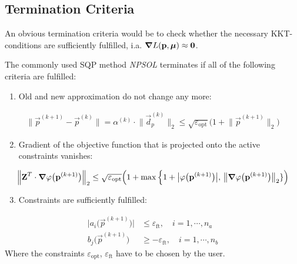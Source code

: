 		\subsection{Termination Criteria}
			An obvious termination criteria would be to check whether the necessary KKT-conditions are sufficiently fulfilled, i.a. \( \grad{L}(\boldsymbol{\mathrm{p}}, \boldsymbol{\mathrm{\mu}}) \approx \boldsymbol{\mathrm{0}} \).
			
			The commonly used SQP method \emph{NPSOL} terminates if all of the following criteria are fulfilled:
			\begin{enumerate}
				\item Old and new approximation do not change any more:
			\end{enumerate}
			\begin{align*}
				\big\lVert \vec{p}^{(k + 1)} - \vec{p}^{(k)} \big\rVert = \alpha^{(k)} \cdot \big\lVert \vec{d}_p^{(k)} \big\rVert_2 \leq \sqrt{\varepsilon_\mathrm{opt}} \Big( 1 + \big\lVert \vec{p}^{(k + 1)} \big\rVert_2 \Big)
			\end{align*}
			\begin{enumerate}
				\setcounter{enumi}{1}
				\item Gradient of the objective function that is projected onto the active constraints vanishes:
			\end{enumerate}
			\begin{align*}
				\Big\lVert \boldsymbol{\mathrm{Z}}^T \cdot \grad{\varphi}\big(\boldsymbol{\mathrm{p}}^{(k + 1)}\big) \Big\rVert_2 \leq \sqrt{\varepsilon_\mathrm{opt}} \Big( 1 + \max\Big\{ 1 + \big\lvert \varphi\big(\boldsymbol{\mathrm{p}}^{(k + 1)}\big) \big\rvert,\, \big\lVert \grad{\varphi}\big(\boldsymbol{\mathrm{p}}^{(k + 1)}\big) \big\rVert_2 \} \Big)
			\end{align*}
			\begin{enumerate}
				\setcounter{enumi}{2}
				\item Constraints are sufficiently fulfilled:
			\end{enumerate}
			\begin{align*}
				\big\lvert a_i\big(\vec{p}^{(k + 1)}\big) \big\rvert & \leq \varepsilon_\mathrm{ft},\quad i = 1, \cdots, n_a  \\
				b_j\big(\vec{p}^{(k + 1)}\big)                       & \geq -\varepsilon_\mathrm{ft},\quad i = 1, \cdots, n_b
			\end{align*}
			Where the constraints \( \varepsilon_\mathrm{opt} \), \( \varepsilon_\mathrm{ft} \) have to be chosen by the user.
			
